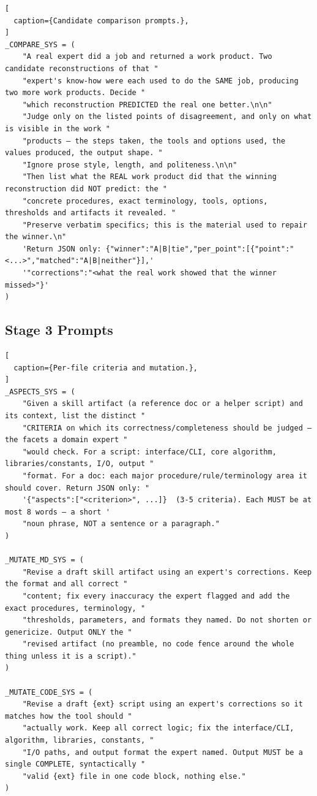 \begin{lstlisting}[
  caption={Candidate comparison prompts.},
]
_COMPARE_SYS = (
    "A real expert did a job and returned a work product. Two candidate reconstructions of that "
    "expert's know-how were each used to do the SAME job, producing two more work products. Decide "
    "which reconstruction PREDICTED the real one better.\n\n"
    "Judge only on the listed points of disagreement, and only on what is visible in the work "
    "products — the steps taken, the tools and options used, the values produced, the output shape. "
    "Ignore prose style, length, and politeness.\n\n"
    "Then list what the REAL work product did that the winning reconstruction did NOT predict: the "
    "concrete procedures, exact terminology, tools, options, thresholds and artifacts it revealed. "
    "Preserve verbatim specifics; this is the material used to repair the winner.\n"
    'Return JSON only: {"winner":"A|B|tie","per_point":[{"point":"<...>","matched":"A|B|neither"}],'
    '"corrections":"<what the real work showed that the winner missed>"}'
)
\end{lstlisting}

\newpage
\subsection{Stage 3 Prompts}

\begin{lstlisting}[
  caption={Per-file criteria and mutation.},
]
_ASPECTS_SYS = (
    "Given a skill artifact (a reference doc or a helper script) and its context, list the distinct "
    "CRITERIA on which its correctness/completeness should be judged — the facets a domain expert "
    "would check. For a script: interface/CLI, core algorithm, libraries/constants, I/O, output "
    "format. For a doc: each major procedure/rule/terminology area it should cover. Return JSON only: "
    '{"aspects":["<criterion>", ...]}  (3-5 criteria). Each MUST be at most 8 words — a short '
    "noun phrase, NOT a sentence or a paragraph."
)

_MUTATE_MD_SYS = (
    "Revise a draft skill artifact using an expert's corrections. Keep the format and all correct "
    "content; fix every inaccuracy the expert flagged and add the exact procedures, terminology, "
    "thresholds, parameters, and formats they named. Do not shorten or genericize. Output ONLY the "
    "revised artifact (no preamble, no code fence around the whole thing unless it is a script)."
)

_MUTATE_CODE_SYS = (
    "Revise a draft {ext} script using an expert's corrections so it matches how the tool should "
    "actually work. Keep all correct logic; fix the interface/CLI, algorithm, libraries, constants, "
    "I/O paths, and output format the expert named. Output MUST be a single COMPLETE, syntactically "
    "valid {ext} file in one code block, nothing else."
)
\end{lstlisting}

